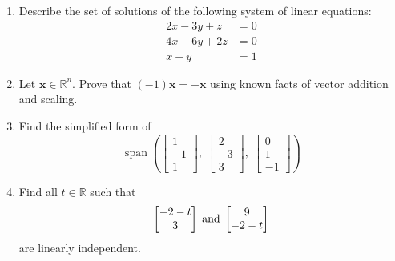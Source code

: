 \documentclass[11pt]{article}
\newcommand{\R}{\mathbb{R}}
\newcommand{\tb}{\textbf}
\newcommand{\tn}{\textnormal}
\theoremstyle{definition}
\begin{document}
\begin{enumerate}
	\item Describe the set of solutions of the following system of linear equations:
	\begin{align*}
		2x - 3y + z & = 0 \\
		4 x - 6y + 2z & = 0 \\
		x - y & = 1
	\end{align*}
	
	\item Let $\tb{x} \in \R^n$. Prove that $(-1) \tb{x} = - \tb{x}$ using known facts of vector addition and scaling.
	
	\item Find the simplified form of
	\begin{equation*}
		\operatorname{span}\left( \begin{bmatrix} 1 \\ - 1 \\ 1 \end{bmatrix}, \; \begin{bmatrix} 2 \\ -3 \\ 3 \end{bmatrix}, \; \begin{bmatrix} 0 \\ 1 \\ - 1 \end{bmatrix} \right)
	\end{equation*}
	
	\item Find all $t \in \R$ such that 
	\begin{equation*}
		\begin{bmatrix} -2 -t \\ 3 \end{bmatrix} \; \tn{and} \; \begin{bmatrix} 9 \\ - 2- t \end{bmatrix}
	\end{equation*}
	are linearly independent.
	

\end{enumerate}
\end{document}
